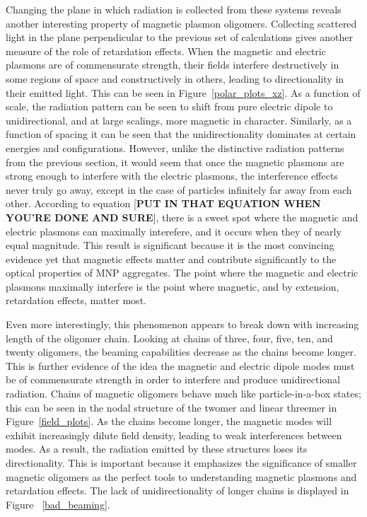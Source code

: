 \documentclass[journal=apchd5,manuscript=article]{achemso}
\begin{document}
Changing the plane in which radiation is collected from these systems reveals another interesting property of magnetic plasmon oligomers. Collecting scattered light in the plane perpendicular to the previous set of calculations gives another measure of the role of retardation effects. When the magnetic and electric plasmons are of commensurate strength, their fields interfere destructively in some regions of space and constructively in others, leading to directionality in their emitted light. This can be seen in Figure~\ref{polar_plots_xz}. As a function of scale, the radiation pattern can be seen to shift from pure electric dipole to unidirectional, and at large scalings, more magnetic in character. Similarly, as a function of spacing it can be seen that the unidirectionality dominates at certain energies and configurations. However, unlike the distinctive radiation patterns from the previous section, it would seem that once the magnetic plasmons are strong enough to interfere with the electric plasmons, the interference effects never truly go away, except in the case of particles infinitely far away from each other. According to equation [\textbf{PUT IN THAT EQUATION WHEN YOU'RE DONE AND SURE}], there is a sweet spot where the magnetic and electric plasmons can maximally interefere, and it occurs when they of nearly equal magnitude. This result is significant because it is the most convincing evidence yet that magnetic effects matter and contribute significantly to the optical properties of MNP aggregates. The point where the magnetic and electric plasmons maximally interfere is the point where magnetic, and by extension, retardation effects, matter most.

Even more interestingly, this phenomenon appears to break down with increasing length of the oligomer chain. Looking at chains of three, four, five, ten, and twenty oligomers, the beaming capabilities decrease as the chains become longer. This is further evidence of the idea the magnetic and electric dipole modes must be of commensurate strength in order to interfere and produce unidirectional radiation. Chains of magnetic oligomers behave much like particle-in-a-box states; this can be seen in the nodal structure of the twomer and linear threemer in Figure~\ref{field_plots}. As the chains become longer, the magnetic modes will exhibit increasingly dilute field density, leading to weak interferences between modes. As a result, the radiation emitted by these structures loses its directionality. This is important because it emphasizes the significance of smaller magnetic oligomers as the perfect tools to understanding magnetic plasmons and retardation effects. The lack of unidirectionality of longer chains is displayed in Figure ~\ref{bad_beaming}.
\end{document}
